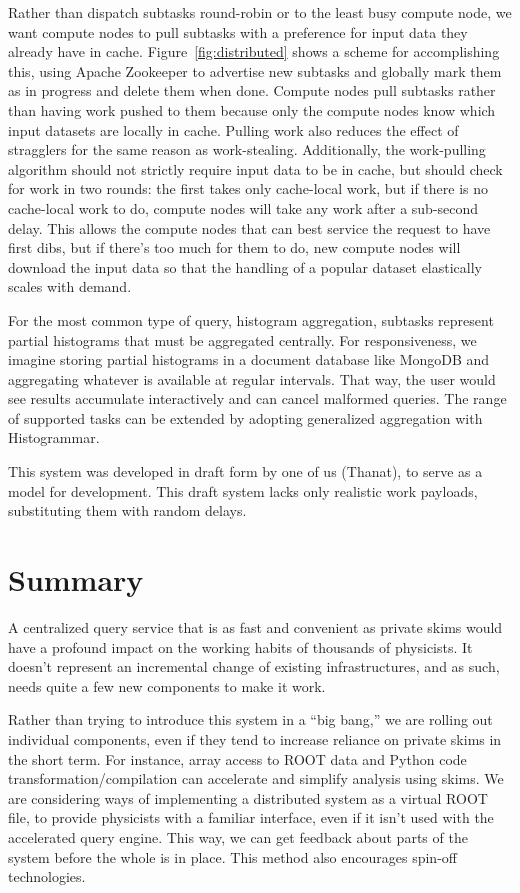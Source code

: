 \documentclass[a4paper]{jpconf}
\begin{document}
Rather than dispatch subtasks round-robin or to the least busy compute node, we want compute nodes to pull subtasks with a preference for input data they already have in cache. Figure~\ref{fig:distributed} shows a scheme for accomplishing this, using Apache Zookeeper to advertise new subtasks and globally mark them as in progress and delete them when done. Compute nodes pull subtasks rather than having work pushed to them because only the compute nodes know which input datasets are locally in cache. Pulling work also reduces the effect of stragglers for the same reason as work-stealing. Additionally, the work-pulling algorithm should not strictly require input data to be in cache, but should check for work in two rounds: the first takes only cache-local work, but if there is no cache-local work to do, compute nodes will take any work after a sub-second delay. This allows the compute nodes that can best service the request to have first dibs, but if there's too much for them to do, new compute nodes will download the input data so that the handling of a popular dataset elastically scales with demand.

For the most common type of query, histogram aggregation, subtasks represent partial histograms that must be aggregated centrally. For responsiveness, we imagine storing partial histograms in a document database like MongoDB and aggregating whatever is available at regular intervals. That way, the user would see results accumulate interactively and can cancel malformed queries. The range of supported tasks can be extended by adopting generalized aggregation with Histogrammar\cite{histogrammar}.

This system was developed in draft form by one of us (Thanat)\cite{thanat}, to serve as a model for development. This draft system lacks only realistic work payloads, substituting them with random delays.

\section{Summary}

A centralized query service that is as fast and convenient as private skims would have a profound impact on the working habits of thousands of physicists. It doesn't represent an incremental change of existing infrastructures, and as such, needs quite a few new components to make it work.

Rather than trying to introduce this system in a ``big bang,'' we are rolling out individual components, even if they tend to increase reliance on private skims in the short term. For instance, array access to ROOT data and Python code transformation/compilation can accelerate and simplify analysis using skims. We are considering ways of implementing a distributed system as a virtual ROOT file, to provide physicists with a familiar interface, even if it isn't used with the accelerated query engine. This way, we can get feedback about parts of the system before the whole is in place. This method also encourages spin-off technologies.
\end{document}
